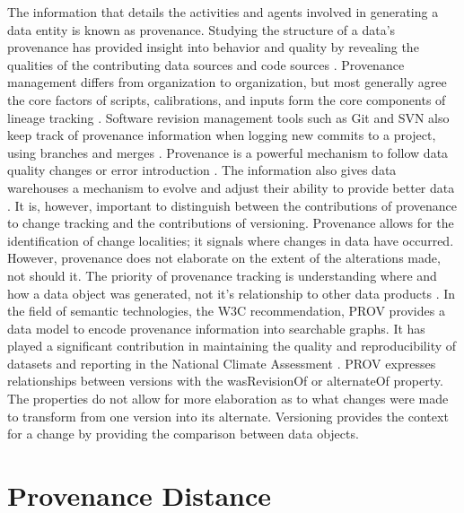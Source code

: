 The information that details the activities and agents involved in generating a data entity is known as provenance.
Studying the structure of a data's provenance has provided insight into behavior and quality by revealing the qualities of the contributing data sources and code sources \cite{dai2014provenance} \cite{Cavanaugh2002}.
Provenance management differs from organization to organization, but most generally agree the core factors of scripts, calibrations, and inputs form the core components of lineage tracking \cite{Barkstrom2003} \cite{Branco2008}.
Software revision management tools such as Git and SVN also keep track of provenance information when logging new commits to a project, using branches and merges  \cite{Chacon:2009:PG:1618548}.
Provenance is a powerful mechanism to follow data quality changes or error introduction .
The information also gives data warehouses a mechanism to evolve and adjust their ability to provide better data \cite{Vassiliadis1999}.
It is, however, important to distinguish between the contributions of provenance to change tracking and the contributions of versioning.
Provenance allows for the identification of change localities; it signals where changes in data have occurred.
However, provenance does not elaborate on the extent of the alterations made, not should it.
The priority of provenance tracking is understanding where and how a data object was generated, not it's relationship to other data products \cite{Bose:2005:LRS:1057977.1057978}.
In the field of semantic technologies, the W3C recommendation, PROV provides a data model to encode provenance information into searchable graphs.
It has played a significant contribution in maintaining the quality and reproducibility of datasets and reporting in the National Climate Assessment \cite{Tilmes2012,Ma2014191,Ma2014}.
PROV expresses relationships between versions with the wasRevisionOf or alternateOf property.
The properties do not allow for more elaboration as to what changes were made to transform from one version into its alternate.
Versioning provides the context for a change by providing the comparison between data objects.

\section{Provenance Distance}

